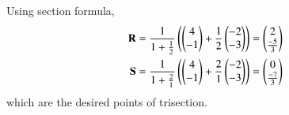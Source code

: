 Using section formula,
\begin{align}
\mathbf{R}=\frac{1}{1+\frac{1}{2}}\left(\begin{pmatrix}4\\-1\end{pmatrix}+\frac{1}{2}\begin{pmatrix}-2\\-3\end{pmatrix}\right)
=\begin{pmatrix}2\\ \frac{-5}{3}\end{pmatrix}\\
\mathbf{S}=\frac{1}{1+\frac{2}{1}}\left(\begin{pmatrix}4\\-1\end{pmatrix}+\frac{2}{1}\begin{pmatrix}-2\\-3\end{pmatrix}\right)
=\begin{pmatrix}0\\ \frac{-7}{3}\end{pmatrix}
\end{align}
which are the desired points of trisection.

